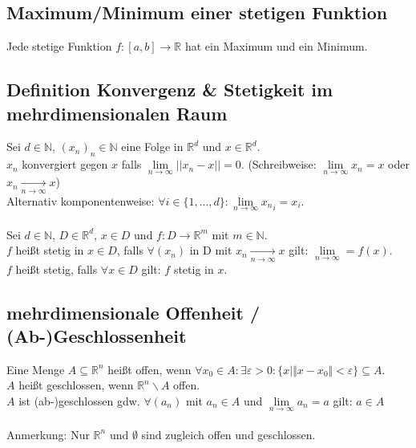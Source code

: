 \documentclass[halfparscip]{scrartcl}
\newcounter{subsection2}
\begin{document}
\subsection{Maximum/Minimum einer stetigen Funktion}
Jede stetige Funktion $f: [a, b] \rightarrow \mathbb{R}$ hat ein Maximum und ein Minimum.

\subsection{Definition Konvergenz \& Stetigkeit im mehrdimensionalen Raum}
Sei $d \in \mathbb{N}$, $(x_n)_n \in \mathbb{N}$ eine Folge in $\mathbb{R}^d$ und $x \in \mathbb{R}^d$.\\
$x_n$ konvergiert gegen $x$ falls $\lim\limits_{n \rightarrow \infty} \vert\vert x_n - x\vert\vert = 0$. (Schreibweise: $\lim\limits_{n \rightarrow \infty} x_n = x$ 
oder \mbox{$x_n \xrightarrow[n \rightarrow \infty]{} x$})\\
Alternativ komponentenweise: $\forall i \in \{1,...,d\}: \lim\limits_{n \rightarrow \infty} {x_n}_i = x_i$.\\\\
Sei $d \in \mathbb{N}$, $D \in \mathbb{R}^d$, $x \in D$ und $f : D \rightarrow \mathbb{R}^m$ mit $m \in \mathbb{N}$.\\
$f$ heißt stetig in $x \in D$, falls $\forall (x_n)$ in D mit $x_n \xrightarrow[n \rightarrow \infty]{} x$ gilt: $\lim\limits_{n \rightarrow \infty} = f(x)$.\\
$f$ heißt stetig, falls $\forall x \in D$ gilt: $f$ stetig in $x$.

\subsection*{mehrdimensionale Offenheit / (Ab-)Geschlossenheit}
Eine Menge $A \subseteq \mathbb{R}^n$ heißt offen, wenn $\forall x_0 \in A: \exists \varepsilon > 0 : \{x \mid \Vert x-x_0\Vert < \varepsilon\} \subseteq A$.\\
$A$ heißt geschlossen, wenn $\mathbb{R}^n \backslash A$ offen.\\
$A$ ist (ab-)geschlossen gdw. $\forall (a_n)$ mit $a_n \in A$ und $\lim\limits_{n \rightarrow \infty} a_n = a$ gilt: $a \in A$\\\\
Anmerkung: Nur $\mathbb{R}^n$ und $\emptyset$ sind zugleich offen und geschlossen.
\end{document}

